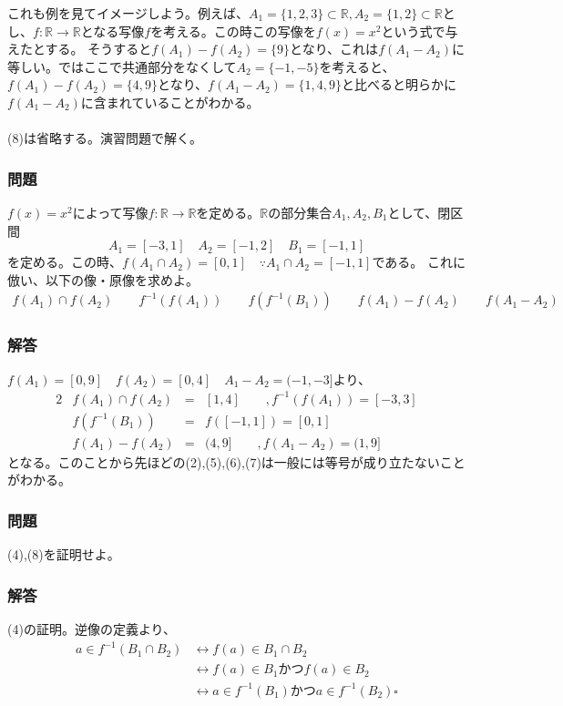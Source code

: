 \documentclass[a4j,dvipdfmx]{jsarticle}
\begin{document}
これも例を見てイメージしよう。例えば、$A_1=\{1,2,3\}\subset\mathbb{R},A_2=\{1,2\}\subset\mathbb{R}$とし、$f:\mathbb{R}\to\mathbb{R}$となる写像$f$を考える。この時この写像を$f(x)=x^2$という式で与えたとする。
そうすると$f(A_1)-f(A_2)=\{9\}$となり、これは$f(A_1-A_2)$に等しい。ではここで共通部分をなくして$A_2=\{-1,-5\}$を考えると、$f(A_1)-f(A_2)=\{4,9\}$となり、$f(A_1-A_2)=\{1,4,9\}$と比べると明らかに$f(A_1-A_2)$に含まれていることがわかる。\\
\hrulefill\\
(8)は省略する。演習問題で解く。\\
\hrulefill

\subsubsection*{問題}
$f(x)=x^2$によって写像$f:\mathbb{R}\to\mathbb{R}$を定める。$\mathbb{R}$の部分集合$A_1,A_2,B_1$として、閉区間
\begin{equation*}
    A_1=[-3,1]\quad A_2=[-1,2]\quad B_1=[-1,1] 
\end{equation*}
を定める。この時、$f(A_1\cap A_2)=[0,1]\quad\because A_1\cap A_2=[-1,1]$である。
これに倣い、以下の像・原像を求めよ。
\begin{align*}
    f(A_1)\cap f(A_2)\qquad f^{-1}(f(A_1))\qquad f(f^{-1}(B_1))\qquad f(A_1)-f(A_2)\qquad f(A_1-A_2)
\end{align*}
\vspace{3cm}
\subsubsection*{解答}
\color{red}
$f(A_1)=[0,9]\quad f(A_2)=[0,4]\quad A_1-A_2=(-1,-3]$より、
\begin{alignat*}{2}
    & f(A_1)\cap f(A_2) & = &[1,4]\qquad, f^{-1}(f(A_1))=[-3,3]\\
    & f(f^{-1}(B_1)) & = &f([-1,1])=[0,1]\\
    & f(A_1)-f(A_2) & = & (4,9]\qquad,f(A_1-A_2)=(1,9]
\end{alignat*}
となる。このことから先ほどの(2),(5),(6),(7)は一般には等号が成り立たないことがわかる。
\color{black}
\newpage
\subsubsection*{問題}
(4),(8)を証明せよ。
\vspace{10cm}
\subsubsection*{解答}
\color{red}
(4)の証明。逆像の定義より、
\begin{align*}
    a\in f^{-1}(B_1\cap B_2)
    &\leftrightarrow f(a)\in B_1\cap B_2\\
    &\leftrightarrow f(a)\in B_1かつf(a)\in B_2\\
    &\leftrightarrow a\in f^{-1}(B_1)かつ a\in f^{-1}(B_2)\square
\end{align*}
\end{document}
